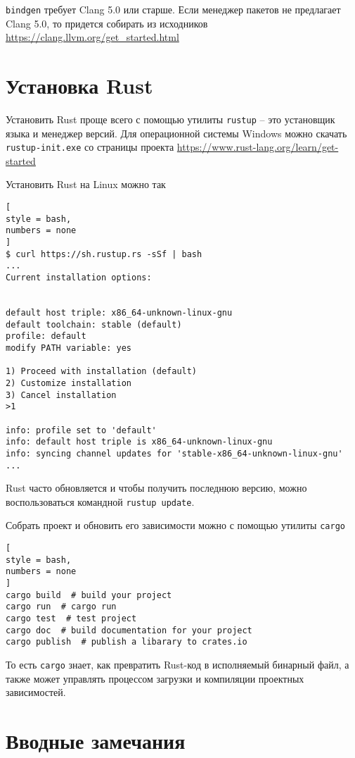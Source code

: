 \documentclass[%
	11pt,
	a4paper,
	utf8,
		]{article}
\begin{document}
\verb|bindgen| требует Clang 5.0 или старше. Если менеджер пакетов не предлагает Clang 5.0, то придется собирать из исходников \url{https://clang.llvm.org/get_started.html}




\section{Установка Rust}

Установить Rust проще всего с помощью утилиты \texttt{rustup} -- это установщик языка и менеджер версий. Для операционной системы Windows можно скачать \texttt{rustup-init.exe} со страницы проекта \url{https://www.rust-lang.org/learn/get-started}

Установить Rust на Linux можно так
\begin{lstlisting}[
style = bash,
numbers = none
]
$ curl https://sh.rustup.rs -sSf | bash
...
Current installation options:


default host triple: x86_64-unknown-linux-gnu
default toolchain: stable (default)
profile: default
modify PATH variable: yes

1) Proceed with installation (default)
2) Customize installation
3) Cancel installation
>1

info: profile set to 'default'
info: default host triple is x86_64-unknown-linux-gnu
info: syncing channel updates for 'stable-x86_64-unknown-linux-gnu'
...
\end{lstlisting}

Rust часто обновляется и чтобы получить последнюю версию, можно воспользоваться командной \texttt{rustup update}.

Собрать проект и обновить его зависимости можно с помощью утилиты \texttt{cargo}
\begin{lstlisting}[
style = bash,
numbers = none
]
cargo build  # build your project
cargo run  # cargo run
cargo test  # test project 
cargo doc  # build documentation for your project
cargo publish  # publish a libarary to crates.io
\end{lstlisting}

То есть \texttt{cargo} знает, как превратить Rust-код в исполняемый бинарный файл, а также может управлять процессом загрузки и компиляции проектных зависимостей.

\section{Вводные замечания}
\end{document}
